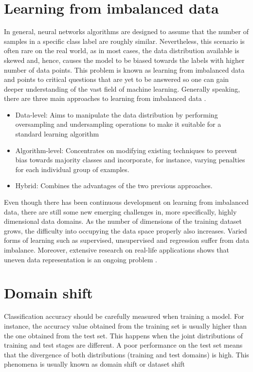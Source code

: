 \section{Learning from imbalanced data}

In general, neural networks algorithms are designed to assume that the number of samples in a specific class label are roughly similar. Nevertheless, this scenario is often rare on the real world, as in most cases, the data distribution available is skewed and, hence, causes the model to be biased towards the labels with higher number of data points. This problem is known as learning from imbalanced data \cite{japkowicz2002class} and points to critical questions that are yet to be answered so one can gain deeper understanding of the vast field of machine learning. Generally speaking, there are three main approaches to learning from imbalanced data \cite{krawczyk2016learning}. 
\begin{itemize}
	\item Data-level: Aims to manipulate the data distribution by performing oversampling and undersampling operations to make it suitable for a standard learning algorithm
	\item Algorithm-level: Concentrates on modifying existing techniques to prevent bias towards majority classes and incorporate, for instance, varying penalties for each individual group of examples.
	\item Hybrid: Combines the advantages of the two previous approaches.
\end{itemize}

Even though there has been continuous development on learning from imbalanced data, there are still some new emerging challenges in, more specifically, highly dimensional data domains. As the number of dimensions of the training dataset grows, the difficulty into occupying the data space properly also increases. Varied forms of learning such as supervised, unsupervised and regression suffer from data imbalance. Moreover, extensive research on real-life applications shows that uneven data representation is an ongoing problem \cite{krawczyk2016learning}.

\section{Domain shift}



Classification accuracy should be carefully measured when training a model. For instance, the accuracy value obtained from the training set is usually higher than the one obtained from the test set. This happens when the joint distributions of training and test stages are different. A poor performance on the test set means that the divergence of both distributions (training and test domains) is high. This phenomena is usually known as domain shift or dataset shift \cite{Quionero}

